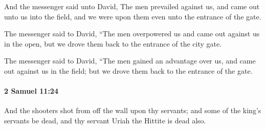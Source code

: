 			\begin{versebox}
					\item[BHS] 
					\item[ASV] And the messenger said unto David, The men prevailed against us, and came out unto us into the field, and we were upon them even unto the entrance of the gate.
					\item[NIV] The messenger said to David, “The men overpowered us and came out against us in the open, but we drove them back to the entrance of the city gate.
					\item[NRSV] The messenger said to David, “The men gained an advantage over us, and came out against us in the field; but we drove them back to the entrance of the gate.
			\end{versebox}

		\paragraph{2 Samuel 11:24} %
			\label{2SAMUEL-11-24}

			And the shooters shot from off the wall upon thy servants; and some of the king’s servants be dead, and thy servant Uriah the Hittite is dead also.


